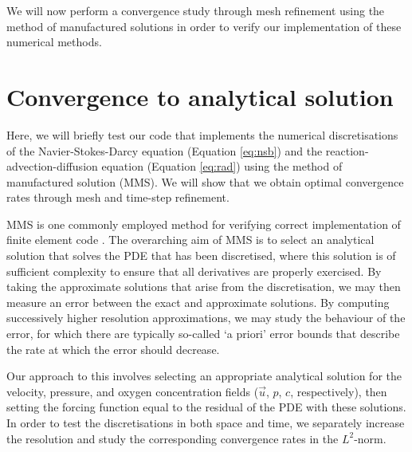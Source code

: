             We will now perform a convergence study through mesh refinement using the method of manufactured solutions in order to verify our implementation of these numerical methods.

    \section{Convergence to analytical solution} \label{sec:numerical-methods:convergence}
        Here, we will briefly test our code that implements the numerical discretisations of the Navier-Stokes-Darcy equation (Equation \eqref{eq:nsb}) and the reaction-advection-diffusion equation (Equation \eqref{eq:rad}) using the method of manufactured solution (MMS). We will show that we obtain optimal convergence rates through mesh and time-step refinement.

        MMS is one commonly employed method for verifying correct implementation of finite element code \cite{roacheCodeVerificationMethod2002}. The overarching aim of MMS is to select an analytical solution that solves the PDE that has been discretised, where this solution is of sufficient complexity to ensure that all derivatives are properly exercised. By taking the approximate solutions that arise from the discretisation, we may then measure an error between the exact and approximate solutions. By computing successively higher resolution approximations, we may study the behaviour of the error, for which there are typically so-called `a priori' error bounds that describe the rate at which the error should decrease.
        
        Our approach to this involves selecting an appropriate analytical solution for the velocity, pressure, and oxygen concentration fields ($\vec{u}$, $p$, $c$, respectively), then setting the forcing function equal to the residual of the PDE with these solutions. In order to test the discretisations in both space and time, we separately increase the resolution and study the corresponding convergence rates in the $L^2$-norm.

